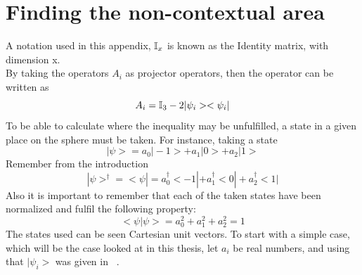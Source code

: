 \documentclass[
  utf8,%
  parskip,%
  largesmallcaps,intlimits,widermath,%
  sharecounter,nobreak,definition=marks,%
  noparts%
]{rtthesis}
\begin{document}
\section{Finding the non-contextual area}
A notation used in this appendix, $\mathbb{I}_x$ is known as the Identity matrix, with dimension x. \\
By taking the operators $A_i$ as projector operators, then the operator can be written as 
\begin{equation} \label{eq:Defop}
A_i = \mathbb{I}_3 - 2 |\psi_i><\psi_i|  
\end{equation}
To be able to calculate where the inequality may be unfulfilled, a state in a given place on the sphere must be taken.
For instance, taking a state 
\begin{equation}
|\psi> = a_0|-1>+a_1|0>+a_2|1> 
\end{equation}
Remember from the introduction~
\begin{equation}
|\psi>^\dagger = <\psi|=a_0^\dagger<-1|+a_1^\dagger<0|+a_2^\dagger<1| 
\end{equation}
Also it is important to remember that each of the taken states have been normalized and fulfil the following property:
\begin{equation}
<\psi|\psi> = a_0^2+a_1^2+a_2^2 = 1 
\end{equation}
The states used can be seen Cartesian unit vectors. To start with a simple case, which will be the case looked at in this thesis, let $a_i$ be real numbers, and using that $|\psi_i>$ was given in ~.
\end{document}
